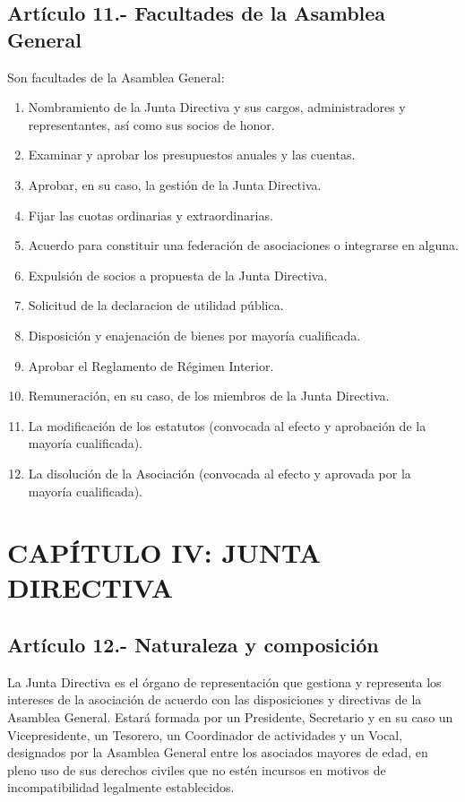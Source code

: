\documentclass[10pt, spanish, pdftex]{gulplantilla}
\begin{document}
\subsection{Artículo 11.- Facultades de la Asamblea General}
Son facultades de la Asamblea General:
\begin{enumerate}[label=\alph*)]
    \item Nombramiento de la Junta Directiva y sus cargos, administradores y representantes, así como sus socios de honor.
    \item Examinar y aprobar los presupuestos anuales y las cuentas.
    \item Aprobar, en su caso, la gestión de la Junta Directiva.
    \item Fijar las cuotas ordinarias y extraordinarias.
    \item Acuerdo para constituir una federación de asociaciones o integrarse en alguna.
    \item Expulsión de socios a propuesta de la Junta Directiva.
    \item Solicitud de la declaracion de utilidad pública.
    \item Disposición y enajenación de bienes por mayoría cualificada.
    \item Aprobar el Reglamento de Régimen Interior.
    \item Remuneración, en su caso, de los miembros de la Junta Directiva.
    \item La modificación de los estatutos (convocada al efecto y aprobación de la mayoría cualificada).
    \item La disolución de la Asociación (convocada al efecto y aprovada por la mayoría cualificada).
\end{enumerate}


\newpage {}
\section{CAPÍTULO IV: JUNTA DIRECTIVA}


\subsection{Artículo 12.- Naturaleza y composición}
La Junta Directiva es el órgano de representación que gestiona y representa los intereses de la asociación de acuerdo con las disposiciones y directivas de la Asamblea General. Estará formada por un Presidente, Secretario y en su caso un Vicepresidente, un Tesorero, un Coordinador de actividades y un Vocal, designados por la Asamblea General entre los asociados mayores de edad, en pleno uso de sus derechos civiles que no estén incursos en motivos de incompatibilidad legalmente establecidos.
\end{document}

